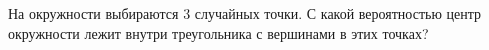 \documentclass{article}
\begin{document}
На окружности выбираются $3$ случайных точки. С какой вероятностью центр окружности лежит внутри треугольника с вершинами
в этих точках?
\end{document}
